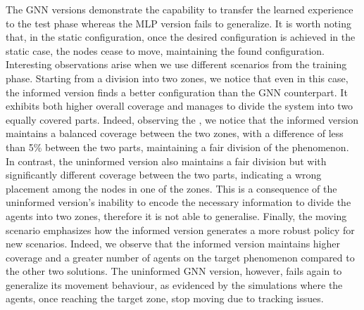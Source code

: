 \documentclass[conference]{IEEEtran}
\begin{document}
The \ac{GNN} versions demonstrate the capability to transfer the learned experience to the test phase whereas the MLP version fails to generalize. 
%
It is worth noting that, in the static configuration, 
 once the desired configuration is achieved in the static case, 
 the nodes cease to move, maintaining the found configuration.
%
Interesting observations arise when we use different scenarios from the training phase. 
 Starting from a division into two zones, 
 we notice that even in this case, the informed version finds a better configuration than the GNN counterpart. 
%
It exhibits both higher overall coverage and manages to divide the system into two equally covered parts.
%
Indeed, observing the , we notice that the informed version maintains a balanced coverage between the two zones, 
 with a difference of less than 5\% between the two parts, maintaining a fair division of the phenomenon.
%
In contrast, the uninformed version also maintains a fair division but with significantly different coverage between the two parts, 
 indicating a wrong placement among the nodes in one of the zones.
%
This is a consequence of the uninformed version's inability to encode the necessary information to divide the agents into two zones, therefore it is not able to generalise.
%
Finally, the moving scenario emphasizes how the informed version generates a more robust policy for new scenarios. 
 Indeed, we observe that the informed version maintains higher coverage and a greater number of agents on the target phenomenon compared to the other two solutions.
%
The uninformed GNN version, however, 
 fails again to generalize its movement behaviour, as evidenced by the simulations where the agents, once reaching the target zone, stop moving due to tracking issues.
\end{document}
